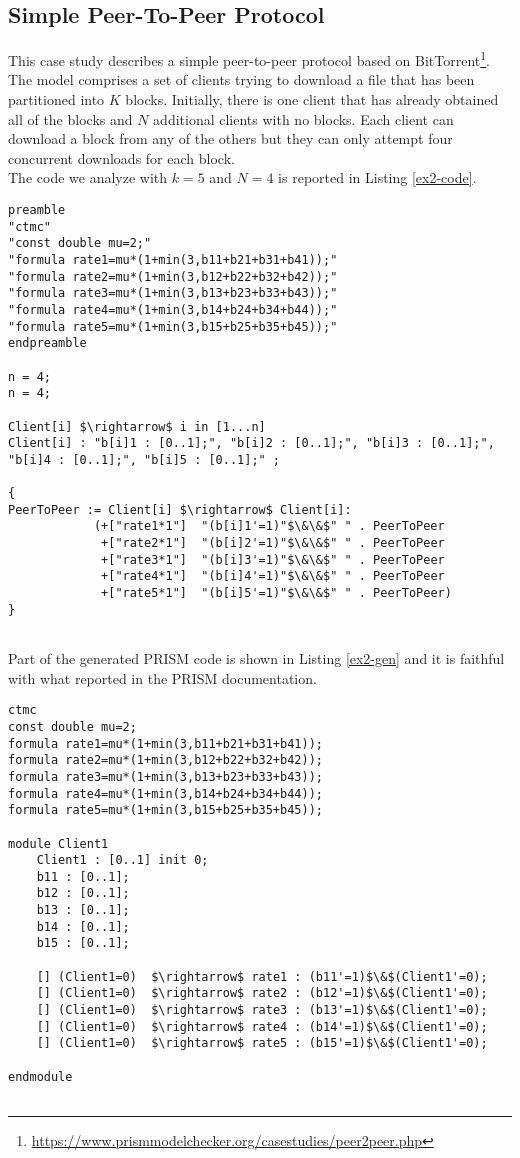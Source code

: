 \subsection{Simple Peer-To-Peer Protocol}
This case study describes a simple peer-to-peer protocol based on BitTorrent\footnote{\url{https://www.prismmodelchecker.org/casestudies/peer2peer.php}}. The model comprises a set of clients trying to download a file that has been partitioned into $K$ blocks. Initially, there is one client that has already obtained all of the blocks and $N$ additional clients with no blocks. Each client can download a block from any of the others but they can only attempt four concurrent downloads for each block.\\
The code we analyze with $k=5$ and $N=4$ is reported in Listing \ref{ex2-code}.
\begin{lstlisting}[style=chor-color,caption={Choreographic language for the Peer-To-Peer Protocol.},captionpos=b,label={ex2-code}]
preamble
"ctmc"
"const double mu=2;"
"formula rate1=mu*(1+min(3,b11+b21+b31+b41));"
"formula rate2=mu*(1+min(3,b12+b22+b32+b42));"
"formula rate3=mu*(1+min(3,b13+b23+b33+b43));"
"formula rate4=mu*(1+min(3,b14+b24+b34+b44));"
"formula rate5=mu*(1+min(3,b15+b25+b35+b45));"
endpreamble

n = 4;
n = 4;

Client[i] $\rightarrow$ i in [1...n]
Client[i] : "b[i]1 : [0..1];", "b[i]2 : [0..1];", "b[i]3 : [0..1];", "b[i]4 : [0..1];", "b[i]5 : [0..1];" ;

{
PeerToPeer := Client[i] $\rightarrow$ Client[i]: 
			(+["rate1*1"]  "(b[i]1'=1)"$\&\&$" " . PeerToPeer
			 +["rate2*1"]  "(b[i]2'=1)"$\&\&$" " . PeerToPeer
			 +["rate3*1"]  "(b[i]3'=1)"$\&\&$" " . PeerToPeer
			 +["rate4*1"]  "(b[i]4'=1)"$\&\&$" " . PeerToPeer
			 +["rate5*1"]  "(b[i]5'=1)"$\&\&$" " . PeerToPeer)
}
	
\end{lstlisting}

Part of the generated PRISM code is shown in Listing \ref{ex2-gen} and it is faithful with what reported in the PRISM documentation. 
\begin{lstlisting}[style=prism-color,caption={Generated PRISM program for the Peer-To-Peer Protocol.},captionpos=b,label={ex2-gen}]
ctmc
const double mu=2;
formula rate1=mu*(1+min(3,b11+b21+b31+b41));
formula rate2=mu*(1+min(3,b12+b22+b32+b42));
formula rate3=mu*(1+min(3,b13+b23+b33+b43));
formula rate4=mu*(1+min(3,b14+b24+b34+b44));
formula rate5=mu*(1+min(3,b15+b25+b35+b45));

module Client1
	Client1 : [0..1] init 0;
	b11 : [0..1]; 
	b12 : [0..1]; 
	b13 : [0..1]; 
	b14 : [0..1]; 
	b15 : [0..1]; 

	[] (Client1=0)  $\rightarrow$ rate1 : (b11'=1)$\&$(Client1'=0); 
	[] (Client1=0)  $\rightarrow$ rate2 : (b12'=1)$\&$(Client1'=0); 
	[] (Client1=0)  $\rightarrow$ rate3 : (b13'=1)$\&$(Client1'=0); 
	[] (Client1=0)  $\rightarrow$ rate4 : (b14'=1)$\&$(Client1'=0); 
	[] (Client1=0)  $\rightarrow$ rate5 : (b15'=1)$\&$(Client1'=0); 
	
endmodule
	
\end{lstlisting}


